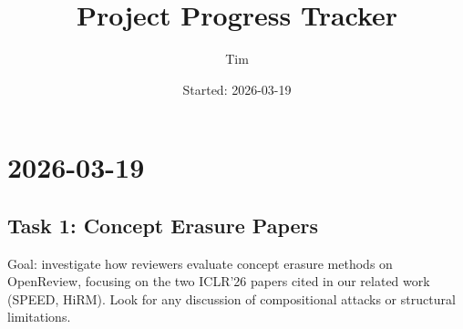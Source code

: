 \documentclass[11pt,a4paper]{article}
\title{Project Progress Tracker}
\author{Tim}
\date{Started: 2026-03-19}
\begin{document}
\maketitle
\tableofcontents
\newpage

\section{2026-03-19}

\subsection{Task 1: Concept Erasure Papers}

Goal: investigate how reviewers evaluate concept erasure methods on OpenReview, focusing on the two ICLR'26 papers cited in our related work (SPEED, HiRM). Look for any discussion of compositional attacks or structural limitations.
\end{document}
